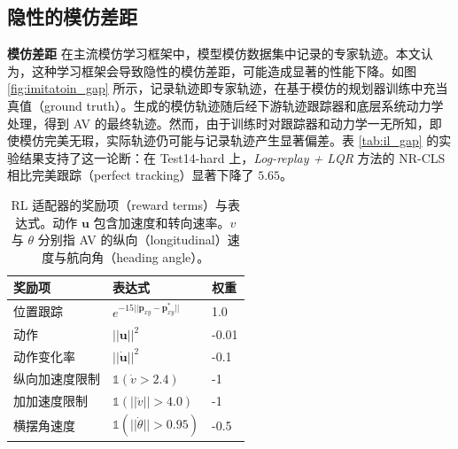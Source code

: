 \documentclass[letterpaper, 10 pt, conference]{ieeeconf}  %
\renewcommand{\paragraph}[1]{\vspace{1.25mm}\noindent\textbf{#1}}
\begin{document}
\subsection{隐性的模仿差距}

\paragraph{模仿差距} 在主流模仿学习框架中，模型模仿数据集中记录的专家轨迹。本文认为，这种学习框架会导致隐性的模仿差距，可能造成显著的性能下降。如图 \ref{fig:imitatoin_gap} 所示，记录轨迹即专家轨迹，在基于模仿的规划器训练中充当真值（ground truth）。生成的模仿轨迹随后经下游轨迹跟踪器和底层系统动力学处理，得到 AV 的最终轨迹。然而，由于训练时对跟踪器和动力学一无所知，即使模仿完美无瑕，实际轨迹仍可能与记录轨迹产生显著偏差。表 \ref{tab:il_gap} 的实验结果支持了这一论断：在 Test14-hard 上，\textit{Log-replay + LQR} 方法的 NR-CLS 相比完美跟踪（perfect tracking）显著下降了 $5.65$。

\begin{table}
\begin{center}
\setlength{\tabcolsep}{5pt}
\renewcommand{\arraystretch}{1.1}
\small
\begin{tabular}{y{70}x{70}x{60}}
\toprule
奖励项       & 表达式 & 权重 \\ \midrule
位置跟踪 & $e^{-15||\mathbf{p}_{xy}-\mathbf{p}^*_{xy}||}$ &  1.0     \\
动作            & $||\mathbf{u}||^2$ & -0.01    \\
动作变化率       & $||\dot{\mathbf{u}}||^2$ & -0.1     \\
纵向加速度限制   & $\mathbb{1}({\dot{v}}>2.4)$ & -1    \\
加加速度限制        & $\mathbb{1}(||{\ddot{v}}||>4.0)$  & -1        \\
横摆角速度          & $\mathbb{1}(||{\dot{\theta}}||>0.95)$ & -0.5        \\ \bottomrule
\end{tabular}
\end{center}
\vspace{0.5em}
\caption{RL 适配器的奖励项（reward terms）与表达式。动作 $\mathbf{u}$ 包含加速度和转向速率。$v$ 与 $\theta$ 分别指 AV 的纵向（longitudinal）速度与航向角（heading angle）。}
\label{tab:rewards}
\vspace{-1em}
\end{table}
\end{document}
